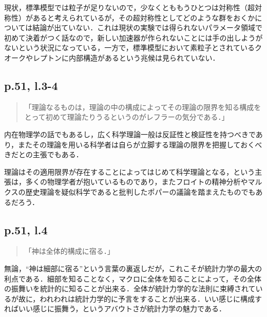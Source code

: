 \documentclass[10pt, a5paper, twoside]{jsarticle}
\theoremstyle{definition}
\begin{document}
                現状，標準模型では粒子が足りないので，少なくとももうひとつは対称性（超対称性）があると考えられているが，その超対称性としてどのような群をおくかについては結論が出ていない．これは現状の実験では得られないパラメータ領域で初めて決着がつく話なので，新しい加速器が作られないことには手の出しようがないという状況になっている，一方で，標準模型において素粒子とされているクオークやレプトンに内部構造があるという兆候は見られていない．

            \subsection{p.51, l.3-4}

                \begin{quote}

                    「理論なるものは，理論の中の構成によってその理論の限界を知る構成をとって初めて理論たりうるというのがレフラーの気分である．」

                \end{quote}

                内在物理学の話でもあるし，広く科学理論一般は反証性と検証性を持つべきであり，またその理論を用いる科学者は自らが立脚する理論の限界を把握しておくべきだとの主張でもある．

                理論はその適用限界が存在することによってはじめて科学理論となる，という主張は，多くの物理学者が抱いているものであり，またフロイトの精神分析やマルクスの歴史理論を疑似科学であると批判したポパーの議論を踏まえたものでもあるだろう．


            \subsection{p.51, l.4}

                \begin{quote}

                    「神は全体的構成に宿る．」

                \end{quote}

                無論，“神は細部に宿る”という言葉の裏返しだが，これこそが統計力学の最大の利点である．細部を知ることなく，マクロに全体を知ることによって，その全体の振舞いを統計的に知ることが出来る．全体が統計力学的な法則に束縛されているが故に，われわれは統計力学的に予言をすることが出来る．いい感じに構成すればいい感じに振舞う，というアバウトさが統計力学の魅力である．
\end{document}
